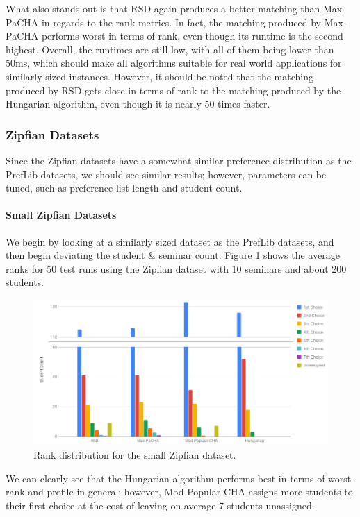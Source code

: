 What also stands out is that RSD again produces a better matching than Max-PaCHA in regards to the rank metrics. In fact, the matching produced by Max-PaCHA performs worst in terms of rank, even though its runtime is the second highest. Overall, the runtimes are still low, with all of them being lower than 50ms, which should make all algorithms suitable for real world applications for similarly sized instances. However, it should be noted that the matching produced by RSD gets close in terms of rank to the matching produced by the Hungarian algorithm, even though it is nearly 50 times faster.

\subsubsection{Zipfian Datasets}
Since the Zipfian datasets have a somewhat similar preference distribution as the PrefLib datasets, we should see similar results; however, parameters can be tuned, such as preference list length and student count.

\paragraph{Small Zipfian Datasets}
We begin by looking at a similarly sized dataset as the PrefLib datasets, and then begin deviating the student \& seminar count. Figure \ref{fig:zipfian-small-distribution} shows the average ranks for 50 test runs using the Zipfian dataset with 10 seminars and about 200 students. 

\begin{figure}[h!]
  \centering
    \includegraphics[width=0.75\linewidth]{assets/plots/small-zipfian-cropped.png}
    \caption{Rank distribution for the small Zipfian dataset.}
    \label{fig:zipfian-small-distribution}
\end{figure}

We can clearly see that the Hungarian algorithm performs best in terms of worst-rank and profile in general; however, Mod-Popular-CHA assigns more students to their first choice at the cost of leaving on average 7 students unassigned.

